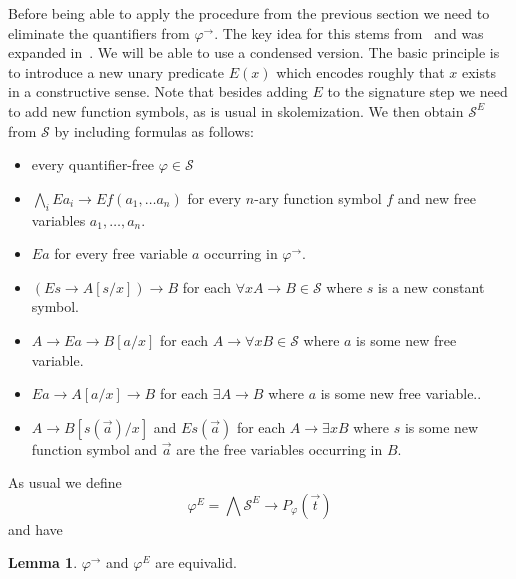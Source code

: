 \documentclass[a4paper,12pt]{report}
\theoremstyle{definition}
\theoremstyle{definition}
\theoremstyle{definition}
\newtheorem{lemma}[theorem]{Lemma}
\theoremstyle{definition}
\theoremstyle{definition}
\theoremstyle{definition}
\theoremstyle{definition}
\begin{document}
	Before being able to apply the procedure from the previous section we need to eliminate the quantifiers from $\varphi^\to$. The key idea for this stems from~\cite{baaz2006skolemization} and was expanded in~\cite{iemhoff2010eskolemization}. We will be able to use a condensed version. The basic principle is to introduce a new unary predicate $E(x)$ which encodes roughly that $x$ exists in a constructive sense. Note that besides adding $E$ to the signature step we need to add new function symbols, as is usual in skolemization. We then obtain $\mathcal S^E$ from $\mathcal S$ by including formulas as follows:
	
	\begin{itemize}
		\item every quantifier-free $\varphi\in\mathcal S$
		\item $\bigwedge_i E a_i \to Ef(a_1,\dots a_n)$ for every $n$-ary function symbol $f$ and new free variables $a_1,\dots, a_n$.
		\item $Ea$ for every free variable $a$ occurring in $\varphi^\to$.
		\item $(Es\to A[s/x])\to B$ for each $\forall xA\to B\in\mathcal{S}$ where $s$ is a new constant symbol.
		\item $A\to Ea\to B[a/x]$ for each $A\to \forall xB\in\mathcal S$  where $a$ is some new free variable.
		\item $Ea\to A[a/x]\to B$ for each $\exists A\to B$ where $a$ is some new free variable..
		\item $A\to B[s(\vec a)/x]$ and $Es(\vec a)$ for each $A\to \exists xB$ where $s$ is some new function symbol and $\vec a$ are the free variables occurring in $B$.
	\end{itemize}
	As usual we define $$\varphi^E = \bigwedge \mathcal S^E\to P_\varphi(\vec t)$$
	and have 
	\begin{lemma}
		$\varphi^\to$ and $\varphi^E$ are equivalid.
	\end{lemma}
\end{document}
